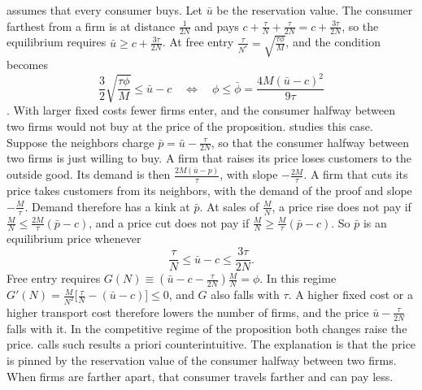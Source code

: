 \begin{remark}\label{rem:04-salop-coverage}
 assumes that every consumer buys. Let $\bar u$ be the reservation value. The consumer farthest
from a firm is at distance $\frac{1}{2N}$ and pays $c + \frac{\tau}{N} + \frac{\tau}{2N} = c + \frac{3\tau}{2N}$, so the
equilibrium requires $\bar u \ge c + \frac{3\tau}{2N}$. At free entry $\frac{\tau}{N^*} = \sqrt{\frac{\tau\phi}{M}}$, and
the condition becomes
\begin{equation*}
\frac{3}{2}\sqrt{\frac{\tau\phi}{M}} \le \bar u - c
\quad\Longleftrightarrow\quad
\phi \le \bar\phi = \frac{4M(\bar u - c)^2}{9\tau}
\end{equation*}
\citep[Section 7.1.2]{Tirole1988}. With larger fixed costs fewer firms enter, and the consumer halfway between two
firms would not buy at the price of the proposition.  studies this case. Suppose the neighbors charge
$\bar p = \bar u - \frac{\tau}{2N}$, so that the consumer halfway between two firms is just willing to buy. A firm that
raises its price loses customers to the outside good. Its demand is then $\frac{2M(\bar u - p)}{\tau}$, with slope
$-\frac{2M}{\tau}$. A firm that cuts its price takes customers from its neighbors, with the demand of the proof and
slope $-\frac{M}{\tau}$. Demand therefore has a kink at $\bar p$. At sales of $\frac{M}{N}$, a price rise does not pay if
$\frac{M}{N} \le \frac{2M}{\tau}(\bar p - c)$, and a price cut does not pay if $\frac{M}{N} \ge \frac{M}{\tau}(\bar p - c)$.
So $\bar p$ is an equilibrium price whenever
\begin{equation*}
\frac{\tau}{N} \le \bar u - c \le \frac{3\tau}{2N} .
\end{equation*}
Free entry requires $G(N) \equiv (\bar u - c - \frac{\tau}{2N})\frac{M}{N} = \phi$. In this regime
$G'(N) = \frac{M}{N^2}\big[\frac{\tau}{N} - (\bar u - c)\big] \le 0$, and $G$ also falls with $\tau$. A higher fixed cost
or a higher transport cost therefore lowers the number of firms, and the price $\bar u - \frac{\tau}{2N}$ falls with it.
In the competitive regime of the proposition both changes raise the price.  calls such results a priori counterintuitive. The explanation is that the price is pinned
by the reservation value of the consumer halfway between two firms. When firms are farther apart, that consumer
travels farther and can pay less.
\end{remark}


